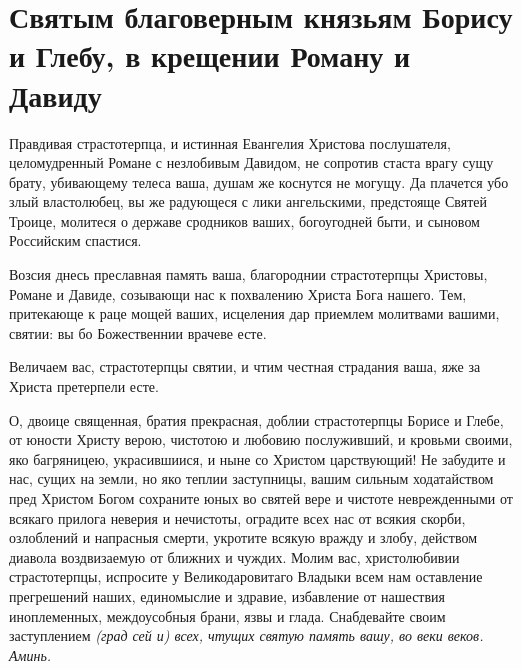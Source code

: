 \mychapterending


 

\section{Святым благоверным князьям Борису и Глебу, в крещении Роману и  Давиду}\begin{mymulticols}
 



Правдивая страстотерпца, и истинная Евангелия Христова послушателя, целомудренный Романе с незлобивым Давидом, не сопротив стаста врагу сущу брату, убивающему телеса ваша, душам же коснутся не могущу. Да плачется убо злый властолюбец, вы же радующеся с лики ангельскими, предстояще Святей Троице, молитеся о державе сродников ваших, богоугодней быти, и сыновом Российским спастися.


Возсия днесь преславная память ваша, благороднии страстотерпцы Христовы, Романе и Давиде, созывающи нас к похвалению Христа Бога нашего. Тем, притекающе к раце мощей ваших, исцеления дар приемлем молитвами вашими, святии: вы бо Божественнии врачеве есте.


Величаем вас, страстотерпцы святии, и чтим честная страдания ваша, яже за Христа претерпели есте.


О, двоице священная, братия прекрасная, доблии страстотерпцы Борисе и Глебе, от юности Христу верою, чистотою и любовию послуживший, и кровьми своими, яко багряницею, украсившиися, и ныне со Христом царствующий! Не забудите и нас, сущих на земли, но яко теплии заступницы, вашим сильным ходатайством пред Христом Богом сохраните юных во святей вере и чистоте неврежденными от всякаго прилога неверия и нечистоты, оградите всех нас от всякия скорби, озлоблений и напрасныя смерти, укротите всякую вражду и злобу, действом диавола воздвизаемую от ближних и чуждих. Молим вас, христолюбивии страстотерпцы, испросите у Великодаровитаго Владыки всем нам оставление прегрешений наших, единомыслие и здравие, избавление от нашествия иноплеменных, междоусобныя брани, язвы и глада. Снабдевайте своим заступлением \itshape (град сей и)\normalfont{} всех, чтущих святую память вашу, во веки веков. Аминь.

\end{mymulticols}

